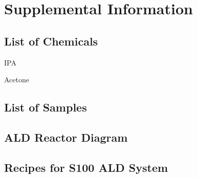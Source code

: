 \chapter{Supplemental Information}
\label{chap:appendix}
\thispagestyle{empty}


\section{List of Chemicals}
\label{sup:LoChemicals}










IPA

Acetone


\section{List of Samples}
\label{sup:LoSamples}



\section{ALD Reactor Diagram}
\label{sup:ALD-design}



\section{Recipes for S100 ALD System}
\label{sup:recipes}


